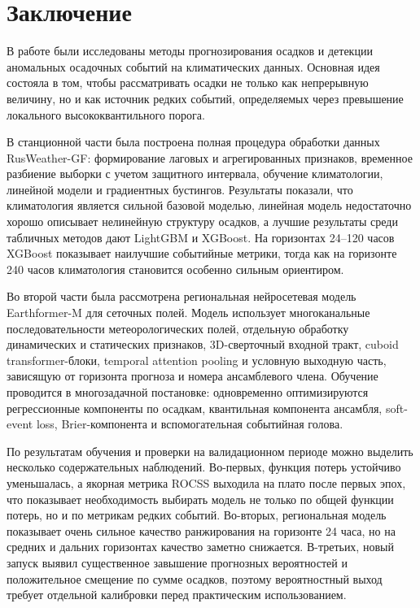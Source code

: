 \chapter*{Заключение}

В работе были исследованы методы прогнозирования осадков и детекции аномальных осадочных событий на климатических данных. Основная идея состояла в том, чтобы рассматривать осадки не только как непрерывную величину, но и как источник редких событий, определяемых через превышение локального высококвантильного порога.

В станционной части была построена полная процедура обработки данных RusWeather-GF: формирование лаговых и агрегированных признаков, временное разбиение выборки с учетом защитного интервала, обучение климатологии, линейной модели и градиентных бустингов. Результаты показали, что климатология является сильной базовой моделью, линейная модель недостаточно хорошо описывает нелинейную структуру осадков, а лучшие результаты среди табличных методов дают LightGBM и XGBoost. На горизонтах 24--120 часов XGBoost показывает наилучшие событийные метрики, тогда как на горизонте 240 часов климатология становится особенно сильным ориентиром.

Во второй части была рассмотрена региональная нейросетевая модель Earthformer-M для сеточных полей. Модель использует многоканальные последовательности метеорологических полей, отдельную обработку динамических и статических признаков, 3D-сверточный входной тракт, cuboid transformer-блоки, temporal attention pooling и условную выходную часть, зависящую от горизонта прогноза и номера ансамблевого члена. Обучение проводится в многозадачной постановке: одновременно оптимизируются регрессионные компоненты по осадкам, квантильная компонента ансамбля, soft-event loss, Brier-компонента и вспомогательная событийная голова.

По результатам обучения и проверки на валидационном периоде можно выделить несколько содержательных наблюдений. Во-первых, функция потерь устойчиво уменьшалась, а якорная метрика ROCSS выходила на плато после первых эпох, что показывает необходимость выбирать модель не только по общей функции потерь, но и по метрикам редких событий. Во-вторых, региональная модель показывает очень сильное качество ранжирования на горизонте 24 часа, но на средних и дальних горизонтах качество заметно снижается. В-третьих, новый запуск выявил существенное завышение прогнозных вероятностей и положительное смещение по сумме осадков, поэтому вероятностный выход требует отдельной калибровки перед практическим использованием.

